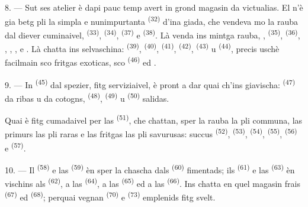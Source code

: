 \VUsaut{4.0mm}
\VUsaut{3.0mm}

8. --- Sut ses atelier è dapi pauc temp avert in grond magasin da victualias. El
n'è gia betg pli la simpla e nunimpurtanta  \textsuperscript{(32)} d'ina giada,
che vendeva mo la rauba dal diever cuminaivel,  \textsuperscript{(33)},
 \textsuperscript{(34)},  \textsuperscript{(37)} e
 \textsuperscript{(38)}. Là venda ins mintga rauba, ,
 \textsuperscript{(35)},  \textsuperscript{(36)}, ,
, ,  e . Là chatta ins
selvaschina:  \textsuperscript{(39)},  \textsuperscript{(40)},
 \textsuperscript{(41)},  \textsuperscript{(42)},  \textsuperscript{(43)} u  \textsuperscript{(44)}, precis uschè
facilmain sco
fritgas exoticas, sco  \textsuperscript{(46)} ed .

9. --- In  \textsuperscript{(45)} dal spezier, fitg serviziaivel, è pront a dar
quai ch'ins giavischa:  \textsuperscript{(47)} da ribas u da cotogns,
 \textsuperscript{(48)},  \textsuperscript{(49)} u
\textsuperscript{(50)} salidas.

Quai è fitg cumadaivel per las  \textsuperscript{(51)}, che chattan, sper la
rauba la pli communa, las primurs las pli raras e las fritgas las pli savurusas:
succus  \textsuperscript{(52)},  \textsuperscript{(53)},
\textsuperscript{(54)},  \textsuperscript{(55)}, 
\textsuperscript{(56)} e  \textsuperscript{(57)}.

\VUsaut{4.0mm}
\VUsaut{3.0mm}

10. --- Il  \textsuperscript{(58)} e las  \textsuperscript{(59)}
èn sper
la chascha dals  \textsuperscript{(60)} fimentads; ils 
\textsuperscript{(61)} e las  \textsuperscript{(63)} èn vischins als
\textsuperscript{(62)}, a las  \textsuperscript{(64)}, a las  \textsuperscript{(65)} ed a las  \textsuperscript{(66)}. Ins chatta en
quel magasin frais  \textsuperscript{(67)} ed  \textsuperscript{(68)};
perquai vegnan  \textsuperscript{(70)} e 
\textsuperscript{(73)} emplenids fitg svelt.

